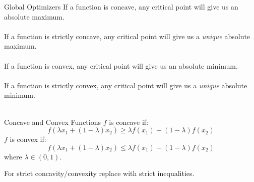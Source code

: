 \documentclass{./../../Latex/teaching_slides}
\begin{document}
\begin{frame}{Global Optimizers}
If a function is concave, any critical point will give us an absolute maximum. \\~\\
If a function is strictly concave, any critical point will give us a \textit{unique} absolute maximum. \\~\\
If a function is convex, any critical point will give us an absolute minimum. \\~\\
If a function is strictly convex, any critical point will give us a \textit{unique} absolute minimum. \\~\\
\end{frame}

\begin{frame}{Concave and Convex Functions}
$f$ is concave if:
$$ f(\lambda x_1 + (1-\lambda) x_2) \geq \lambda f(x_1) + (1-\lambda) f(x_2)  $$
$f$ is convex if:
$$ f(\lambda x_1 + (1-\lambda) x_2) \leq \lambda f(x_1) + (1-\lambda) f(x_2)  $$
where $\lambda \in (0,1)$.
\vspace{1em}

For strict concavity/convexity replace with strict inequalities. 

\end{frame}
\end{document}
